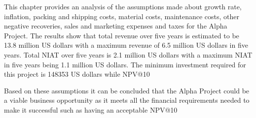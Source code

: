  

This chapter provides an analysis of the assumptions made about growth rate, inflation, packing and shipping costs, material costs, maintenance costs, other negative recoveries, sales and marketing expenses and taxes for the Alpha Project. The results show that total revenue over five years is estimated to be 13.8 million US dollars with a maximum revenue of 6.5 million US dollars in five years. Total NIAT over five years is 2.1 million US dollars with a maximum NIAT in five years being 1.1 million US dollars. The minimum investment required for this project is 148353 US dollars while NPV@10 %

Based on these assumptions it can be concluded that the Alpha Project could be a viable business opportunity as it meets all the financial requirements needed to make it successful such as having an acceptable NPV@10 %